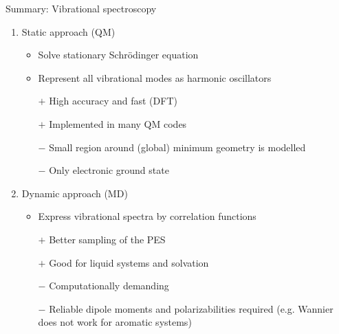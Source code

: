 \documentclass[t]{beamer}
\begin{document}
	\begin{frame}{Summary: Vibrational spectroscopy}
	    \begin{enumerate}
	        \item Static approach (QM)
	        \begin{itemize}
	            \item Solve stationary Schrödinger equation
	            \item Represent all vibrational modes as harmonic oscillators
	            \item[$+$] High accuracy and fast (DFT)
	            \item[$+$] Implemented in many QM codes
	            \item[$-$] Small region around (global) minimum geometry is modelled
	            \item[$-$] Only electronic ground state
	        \end{itemize}
	        \item Dynamic approach (MD)
	        \begin{itemize}
	            \item Express vibrational spectra by correlation functions
	            \item[$+$] Better sampling of the PES
	            \item[$+$] Good for liquid systems and solvation
	            \item[$-$] Computationally demanding
	            \item[$-$] Reliable dipole moments and polarizabilities required (e.g. Wannier does not work for aromatic systems)
	        \end{itemize}
	    \end{enumerate}
	\end{frame}
\end{document}
